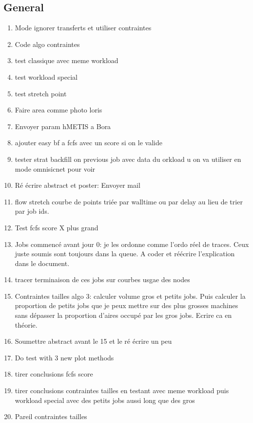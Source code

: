 \documentclass[a4paper]{article}
\begin{document}
	\subsection{General}
		\begin{enumerate}
			\item Mode ignorer transferts et utiliser contraintes
			\item Code algo contraintes
			\item test classique avec meme workload
			\item test workload special
		
		
			\item test stretch point
			\item Faire area comme photo loris
			\item Envoyer param hMETIS a Bora
			
			\item ajouter easy bf a fcfs avec un score si on le valide
			
			\item tester strat backfill on previous job avec data du orkload u on va utiliser en mode omnisicnet pour voir
			
			\item Ré écrire abstract et poster: Envoyer mail
		
			\item flow stretch courbe de points triée par walltime ou par delay au lieu de trier par job ids.
			
			\item Test fcfs score X plus grand
			
			\item Jobs commencé avant jour 0: je les ordonne comme l'ordo réel de traces. Ceux juste soumis sont toujours dans la queue. A coder et réécrire l'explication dans le document.
			\item tracer terminaison de ces jobs sur courbes usgae des nodes
			
			\item Contraintes tailles algo 3: calculer volume gros et petits jobs. Puis calculer la proportion de petits jobs que je peux mettre sur des plus grosses machines sans dépasser la proportion d'aires occupé par les gros jobs. Ecrire ca en théorie.
			
			\item Soumettre abstract avant le 15 et le ré écrire un peu
		
			\item Do test with 3 new plot methods
			\item tirer conclusions fcfs score
			\item tirer conclusions contraintes tailles en testant avec meme workload puis workload special avec des petits jobs aussi long que des gros
			\item Pareil contraintes tailles
			

\end{enumerate}
\end{document}
